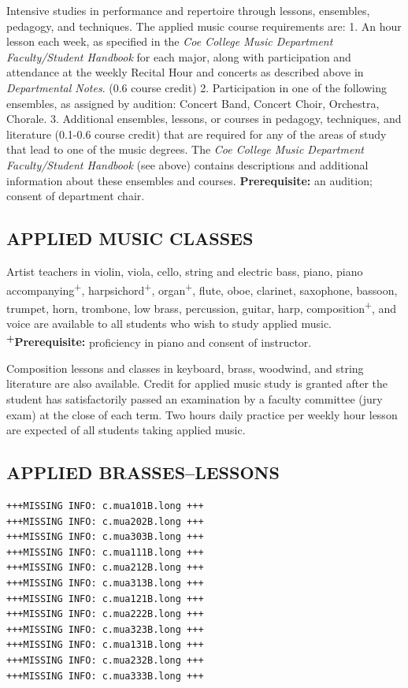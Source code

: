 \documentclass[
  letterpaper,
]{scrbook}
\begin{document}
Intensive studies in performance and repertoire through lessons,
ensembles, pedagogy, and techniques. The applied music course
requirements are: 1. An hour lesson each week, as specified in the
\emph{Coe College Music Department Faculty/Student Handbook} for each
major, along with participation and attendance at the weekly Recital
Hour and concerts as described above in \emph{Departmental Notes}. (0.6
course credit) 2. Participation in one of the following ensembles, as
assigned by audition: Concert Band, Concert Choir, Orchestra, Chorale.
3. Additional ensembles, lessons, or courses in pedagogy, techniques,
and literature (0.1-0.6 course credit) that are required for any of the
areas of study that lead to one of the music degrees. The \emph{Coe
College Music Department Faculty/Student Handbook} (see above) contains
descriptions and additional information about these ensembles and
courses. \textbf{Prerequisite:} an audition; consent of department
chair.

\subsection{APPLIED MUSIC CLASSES}\label{applied-music-classes}

Artist teachers in violin, viola, cello, string and electric bass,
piano, piano accompanying\textsuperscript{+},
harpsichord\textsuperscript{+}, organ\textsuperscript{+}, flute, oboe,
clarinet, saxophone, bassoon, trumpet, horn, trombone, low brass,
percussion, guitar, harp, composition\textsuperscript{+}, and voice are
available to all students who wish to study applied music.
\textbf{\textsuperscript{+}Prerequisite:} proficiency in piano and
consent of instructor.

Composition lessons and classes in keyboard, brass, woodwind, and string
literature are also available. Credit for applied music study is granted
after the student has satisfactorily passed an examination by a faculty
committee (jury exam) at the close of each term. Two hours daily
practice per weekly hour lesson are expected of all students taking
applied music.

\subsection{APPLIED BRASSES--LESSONS}\label{applied-brasseslessons}

\begin{verbatim}
+++MISSING INFO: c.mua101B.long +++
+++MISSING INFO: c.mua202B.long +++
+++MISSING INFO: c.mua303B.long +++
+++MISSING INFO: c.mua111B.long +++
+++MISSING INFO: c.mua212B.long +++
+++MISSING INFO: c.mua313B.long +++
+++MISSING INFO: c.mua121B.long +++
+++MISSING INFO: c.mua222B.long +++
+++MISSING INFO: c.mua323B.long +++
+++MISSING INFO: c.mua131B.long +++
+++MISSING INFO: c.mua232B.long +++
+++MISSING INFO: c.mua333B.long +++
\end{verbatim}
\end{document}
